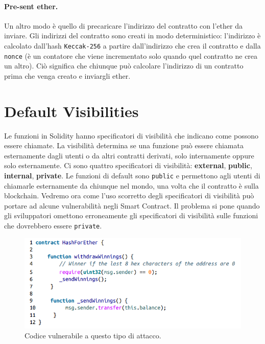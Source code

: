 \paragraph{Pre-sent ether.}

Un altro modo è quello di precaricare l'indirizzo del contratto con l'ether da
inviare. Gli
indirizzi del contratto sono creati in modo deterministico: l'indirizzo è
calcolato dall'hash \verb|Keccak-256| a partire dall'indirizzo che crea il
contratto e dalla \verb|nonce| (è un
contatore che viene incrementato solo quando quel contratto ne crea un altro).
Ciò significa
che chiunque può calcolare l'indirizzo di un contratto prima che venga creato e
inviargli ether.

\section{Default Visibilities}

Le funzioni in Solidity hanno specificatori di visibilità che indicano come
possono essere chiamate. La visibilità determina se una funzione può essere
chiamata esternamente dagli utenti o da altri contratti derivati, solo internamente
oppure solo esternamente.
Ci sono quattro specificatori di visibilità: \textbf{external}, \textbf{public},
\textbf{internal}, \textbf{private}.
Le funzioni di default sono \verb|public| e permettono agli utenti di chiamarle
esternamente da chiunque nel mondo, una volta che il contratto è sulla blockchain.
Vedremo ora come l'uso scorretto degli specificatori di visibilità può portare
ad alcune vulnerabilità negli Smart Contract.
Il problema si pone quando gli sviluppatori omettono erroneamente gli
specificatori di
visibilità sulle funzioni che dovrebbero essere \verb|private|.

\begin{figure}[H]
      \centering
      \includegraphics[width=12cm, keepaspectratio]{capitoli/ethereum/imgs/visibility.png}
      \caption{Codice vulnerabile a questo tipo di attacco.}
\end{figure}

